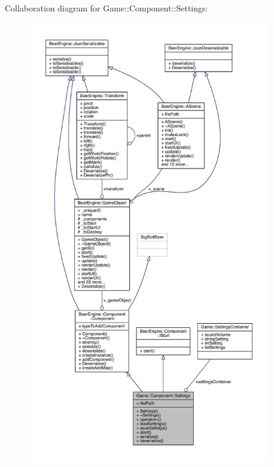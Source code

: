 Collaboration diagram for Game\+:\+:Component\+:\+:Settings\+:\nopagebreak
\begin{figure}[H]
\begin{center}
\leavevmode
\includegraphics[height=550pt]{class_game_1_1_component_1_1_settings__coll__graph}
\end{center}
\end{figure}
